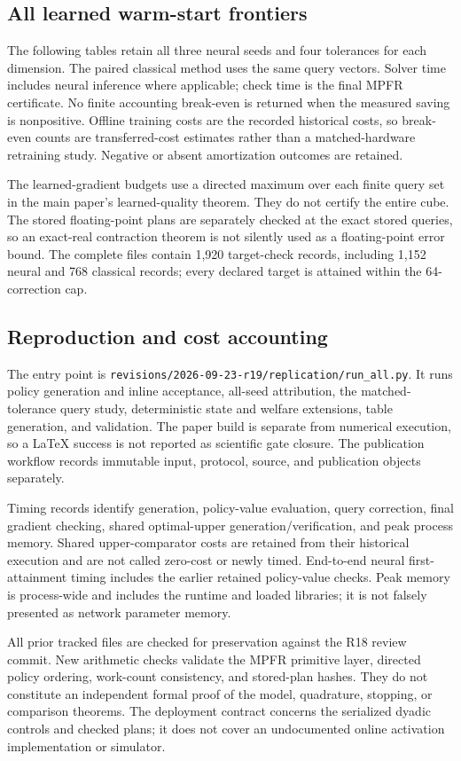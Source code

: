 \subsection{All learned warm-start frontiers}
The following tables retain all three neural seeds and four tolerances for each dimension. The paired classical method uses the same query vectors. Solver time includes neural inference where applicable; check time is the final MPFR certificate. No finite accounting break-even is returned when the measured saving is nonpositive. Offline training costs are the recorded historical costs, so break-even counts are transferred-cost estimates rather than a matched-hardware retraining study. Negative or absent amortization outcomes are retained.



The learned-gradient budgets use a directed maximum over each finite query set in the main paper's learned-quality theorem. They do not certify the entire cube. The stored floating-point plans are separately checked at the exact stored queries, so an exact-real contraction theorem is not silently used as a floating-point error bound. The complete files contain 1,920 target-check records, including 1,152 neural and 768 classical records; every declared target is attained within the 64-correction cap.

\subsection{Reproduction and cost accounting}
The entry point is \texttt{revisions/2026-09-23-r19/replication/run\_all.py}. It runs policy generation and inline acceptance, all-seed attribution, the matched-tolerance query study, deterministic state and welfare extensions, table generation, and validation. The paper build is separate from numerical execution, so a LaTeX success is not reported as scientific gate closure. The publication workflow records immutable input, protocol, source, and publication objects separately.

Timing records identify generation, policy-value evaluation, query correction, final gradient checking, shared optimal-upper generation/verification, and peak process memory. Shared upper-comparator costs are retained from their historical execution and are not called zero-cost or newly timed. End-to-end neural first-attainment timing includes the earlier retained policy-value checks. Peak memory is process-wide and includes the runtime and loaded libraries; it is not falsely presented as network parameter memory.

All prior tracked files are checked for preservation against the R18 review commit. New arithmetic checks validate the MPFR primitive layer, directed policy ordering, work-count consistency, and stored-plan hashes. They do not constitute an independent formal proof of the model, quadrature, stopping, or comparison theorems. The deployment contract concerns the serialized dyadic controls and checked plans; it does not cover an undocumented online activation implementation or simulator.
